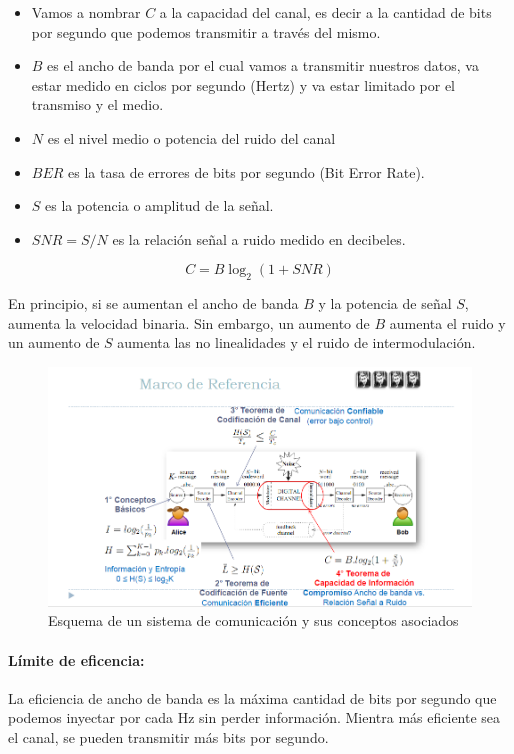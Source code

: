 \documentclass[10pt,a4paper]{article}
\begin{document}
\begin{itemize}
  \item Vamos a nombrar \(C\) a la capacidad del canal, es decir a la cantidad de bits por segundo que podemos transmitir a través del mismo.
  \item \(B\) es el ancho de banda por el cual vamos a transmitir nuestros datos, va estar medido en ciclos por segundo (Hertz) y va estar limitado por el transmiso y el medio.
  \item \(N\) es el nivel medio o potencia del ruido del canal
  \item \(BER\) es la tasa de errores de bits por segundo (Bit Error Rate).
  \item \(S\) es la potencia o amplitud de la señal.
  \item \(SNR = S / N\) es la relación señal a ruido medido en decibeles.
\end{itemize}

\[C = B\log_2(1 + SNR)\]

En principio, si se aumentan el ancho de banda \(B\) y la potencia de señal \(S\), aumenta la velocidad binaria. Sin embargo, un aumento de \(B\) aumenta el ruido y un aumento de \(S\) aumenta las no linealidades y el ruido de intermodulación.

\begin{figure}[H]
	\centering
	\includegraphics[width=\textwidth
]{images/marco-referencia.png}
	\caption[Esquema de un sistema de comunicación y sus conceptos asociados]{Esquema de un sistema de comunicación y sus conceptos asociados}
	\label{fig:marco-referencai}
\end{figure}


\paragraph{Límite de eficencia:} La eficiencia de ancho de banda es la máxima cantidad de bits por segundo que podemos inyectar por cada Hz sin perder información. Mientra más eficiente sea el canal, se pueden transmitir más bits por segundo. 
\end{document}
